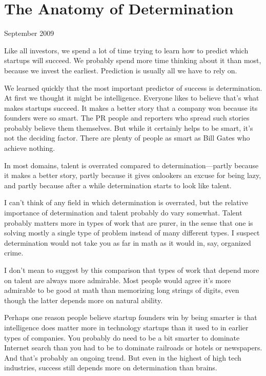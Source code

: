 \chapter{The Anatomy of Determination }

September 2009

Like all investors, we spend a lot of time trying to learn how to
predict which startups will succeed. We probably spend more time
thinking about it than most, because we invest the earliest. Prediction
is usually all we have to rely on.

We learned quickly that the most important predictor of success is
determination. At first we thought it might be intelligence. Everyone
likes to believe that's what makes startups succeed. It makes a better
story that a company won because its founders were so smart. The PR
people and reporters who spread such stories probably believe them
themselves. But while it certainly helps to be smart, it's not the
deciding factor. There are plenty of people as smart as Bill Gates who
achieve nothing.

In most domains, talent is overrated compared to determination---partly
because it makes a better story, partly because it gives onlookers an
excuse for being lazy, and partly because after a while determination
starts to look like talent.

I can't think of any field in which determination is overrated, but the
relative importance of determination and talent probably do vary
somewhat. Talent probably matters more in types of work that are purer,
in the sense that one is solving mostly a single type of problem instead
of many different types. I suspect determination would not take you as
far in math as it would in, say, organized crime.

I don't mean to suggest by this comparison that types of work that
depend more on talent are always more admirable. Most people would agree
it's more admirable to be good at math than memorizing long strings of
digits, even though the latter depends more on natural ability.

Perhaps one reason people believe startup founders win by being smarter
is that intelligence does matter more in technology startups than it
used to in earlier types of companies. You probably do need to be a bit
smarter to dominate Internet search than you had to be to dominate
railroads or hotels or newspapers. And that's probably an ongoing trend.
But even in the highest of high tech industries, success still depends
more on determination than brains.

